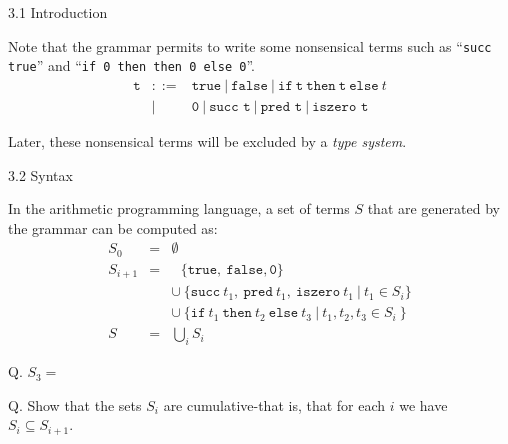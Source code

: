 \documentclass[table]{beamer}
\begin{document}
\begin{frame}[t]{3.1 Introduction} \vspace{10pt}

\vspace{10pt}

Note that the grammar permits to write some nonsensical terms such as ``\texttt{succ true}'' and ``\texttt{if 0 then then 0 else 0}''.
\begin{eqnarray*}
\texttt{t} & ::= & \texttt{true} \ | \ 
 \texttt{false} \ | \ 
 \texttt{if} \ \texttt{t} \ \texttt{then} \ \texttt{t} \ \texttt{else} \ t \\
 & | & \texttt{0} \ | \ 
 \texttt{succ t} \ | \ 
 \texttt{pred t} \ | \ 
 \texttt{iszero t} 
\end{eqnarray*}

\vspace{10pt}

Later, these nonsensical terms will be excluded by a {\it type system}. 
\end{frame}

\begin{frame}[t]{3.2 Syntax} \vspace{10pt}

In the arithmetic programming language, a set of terms $S$ that are generated by the grammar can be computed as:
\begin{eqnarray*}
S_0       & = & \emptyset \\
S_{i+1} & = & \ \ \  \{ \texttt{true}, \ \texttt{false}, \texttt{0} \} \\ 
               &    & \cup \ \{ \texttt{succ} \  t_1, \ \texttt{pred} \ {t_1}, \ \texttt{iszero} \  {t_1} \ | \ t_1 \in S_i \} \\
                &   & \cup \ \{ \texttt{if} \  t_1 \ \texttt{then} \  t_2 \ \texttt{else} \ t_3 \ | \ t_1,t_2,t_3 \in S_i \ \} \\
S            & = & \bigcup_i S_i 
\end{eqnarray*}

Q. $S_3 = $

\vspace{10pt}

Q. Show that the sets $S_i$ are cumulative-that is, that for each $i$ we have $S_i \subseteq S_{i+1}$. 

\end{frame}
\end{document}
